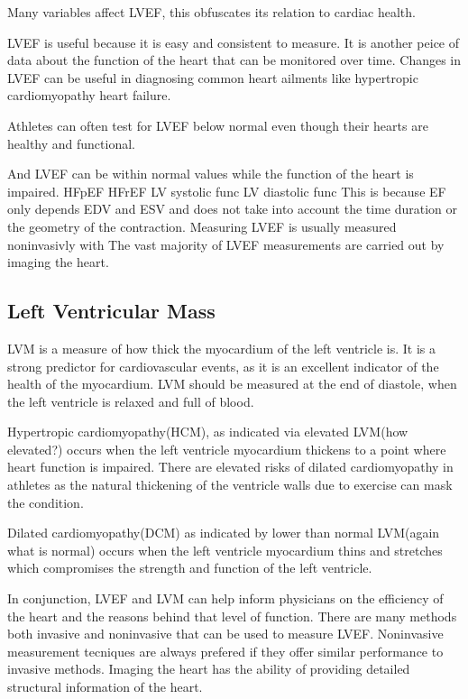 \documentclass{article}
\begin{document}
Many variables affect LVEF, this obfuscates its relation to cardiac health. 

LVEF is useful because it is easy and consistent to measure. It is another peice of data about the function of the heart that can be monitored over time.
Changes in LVEF can be useful in diagnosing common heart ailments like hypertropic cardiomyopathy heart failure.

Athletes can often test for LVEF below normal even though their hearts are healthy and functional\cite{ef_soa}.

And LVEF can be within normal values while the function of the heart is impaired.
HFpEF
HFrEF
LV systolic func
LV diastolic func
This is because EF only depends EDV and ESV and does not take into account the time duration or the geometry of the contraction.
Measuring LVEF is usually measured noninvasivly with 
The vast majority of LVEF measurements are carried out by imaging the heart.
 \cite{understanding-echo}
%

\subsection{Left Ventricular Mass}
LVM is a measure of how thick the myocardium of the left ventricle is.
It is a strong predictor for cardiovascular events\cite{cardiac_chamber_quant_update}, as it is an excellent indicator of the health of the myocardium.
LVM should be measured at the end of diastole, when the left ventricle is relaxed and full of blood.

Hypertropic cardiomyopathy(HCM), as indicated via elevated LVM(how elevated?) occurs when the left ventricle myocardium thickens to a point where heart function is impaired.
There are elevated risks of dilated cardiomyopathy in athletes as the natural thickening of the ventricle walls due to exercise can mask the condition.

Dilated cardiomyopathy(DCM) as indicated by lower than normal LVM(again what is normal) occurs when the left ventricle myocardium thins and stretches which compromises the strength and function of the left ventricle. 

In conjunction, LVEF and LVM can help inform physicians on the efficiency of the heart and the reasons behind that level of function.
There are many methods both invasive and noninvasive that can be used to measure LVEF.
Noninvasive measurement tecniques are always prefered if they offer similar performance to invasive methods.
Imaging the heart has the ability of providing detailed structural information of the heart.
\end{document}
